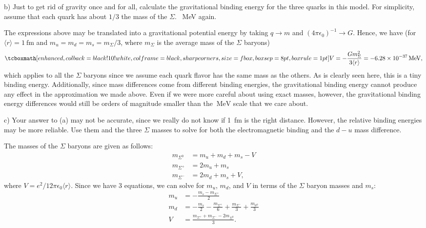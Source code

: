 b) Just to get rid of gravity once and for all, calculate the gravitational binding energy for the three quarks in this model.
For simplicity, assume that each quark has about $1/3$ the mass of the $\Sigma$. \SI{}{\MeV} again.

The expressions above may be translated into a gravitational potential energy by taking $q \rightarrow m$ and $(4\pi\epsilon_0)^{-1} \rightarrow G$. 
Hence, we have (for $\langle r \rangle = \SI{1}{\femto\m}$ and $m_{u} = m_{d} = m_{s} = m_{\Sigma}/3$, where $m_{\Sigma}$ is the average mass of the $\Sigma$ baryons)
\begin{eqnarray}
    \label{eq:potential-energies-gravity}
    \eqbox{
        V = -\frac{G m_{\Sigma}^{2}}{3 \langle r \rangle} = \SI{-6.28e-37}{\MeV}
}
,\end{eqnarray}
which applies to all the $\Sigma$ baryons since we assume each quark flavor has the same mass as the others.
As is clearly seen here, this is a tiny binding energy.
Additionally, since mass differences come from different binding energies, the gravitational binding energy cannot produce any effect in the approximation we made above.
Even if we were more careful about using exact masses, however, the gravitational binding energy differences would still be orders of magnitude smaller than the $\SI{}{\MeV}$ scale that we care about.


c) Your answer to (a) may not be accurate, since we really do not know if \SI{1}{\femto\m} is the right distance.
However, the relative binding energies may be more reliable.
Use them and the three $\Sigma$ masses to solve for both the electromagnetic binding and the $d-u$ mass difference.

The masses of the $\Sigma$ baryons are given as follows:
\begin{align}
    \label{eq:masses_sigma}
    m_{\Sigma^{0}} &= m_{u} + m_{d} + m_{s} - V \\ 
    m_{\Sigma^{+}} &= 2m_{u} + m_{s} \\
    m_{\Sigma^{-}} &= 2m_{d} + m_{s} + V
,\end{align}
where $V = e^2/12\pi\epsilon_0\langle r \rangle$.
Since we have 3 equations, we can solve for $m_{u}$, $m_{d}$, and $V$ in terms of the $\Sigma$ baryon masses and $m_{s}$:
\begin{align}
    \label{eq:solve_system_sigma}
    m_{u} &= -\frac{m_{s} - m_{\Sigma^{+}}}{2}\\
    m_{d} &= -\frac{m_{s}}{2} - \frac{m_{\Sigma^{+}}}{6} + \frac{m_{\Sigma^{-}}}{3} + \frac{m_{\sigma^{0}}}{3} \\
    V &= \frac{m_{\Sigma^{+}} + m_{\Sigma^{-}} - 2m_{\Sigma^{0}}}{3}
.\end{align}

